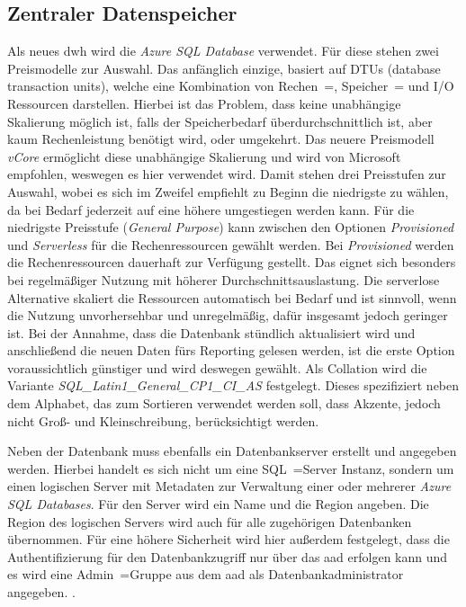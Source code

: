 \subsection{Zentraler Datenspeicher} \label{subsec:infra:konfig:datenspeicher}
Als neues \ac{dwh} wird die \textit{Azure SQL Database} verwendet. Für diese stehen zwei Preismodelle zur Auswahl. Das anfänglich einzige, basiert auf DTUs (database transaction units), welche eine Kombination von Rechen~=, Speicher~= und I/O Ressourcen darstellen. Hierbei ist das Problem, dass keine unabhängige Skalierung möglich ist, falls der Speicherbedarf überdurchschnittlich ist, aber kaum Rechenleistung benötigt wird, oder umgekehrt. Das neuere Preismodell \textit{vCore} ermöglicht diese unabhängige Skalierung und wird von Microsoft empfohlen, weswegen es hier verwendet wird. Damit stehen drei Preisstufen zur Auswahl, wobei es sich im Zweifel empfiehlt zu Beginn die niedrigste zu wählen, da bei Bedarf jederzeit auf eine höhere umgestiegen werden kann. Für die niedrigste Preisstufe (\textit{General Purpose}) kann zwischen den Optionen \textit{Provisioned} und \textit{Serverless} für die Rechenressourcen gewählt werden. Bei \textit{Provisioned} werden die Rechenressourcen dauerhaft zur Verfügung gestellt. Das eignet sich besonders bei regelmäßiger Nutzung mit höherer Durchschnittsauslastung. Die serverlose Alternative skaliert die Ressourcen automatisch bei Bedarf und ist sinnvoll, wenn die Nutzung unvorhersehbar und unregelmäßig, dafür insgesamt jedoch geringer ist. Bei der Annahme, dass die Datenbank stündlich aktualisiert wird und anschließend die neuen Daten fürs Reporting gelesen werden, ist die erste Option voraussichtlich günstiger und wird deswegen gewählt. Als Collation wird die Variante \textit{SQL{\_}Latin1{\_}General{\_}CP1{\_}CI{\_}AS} festgelegt. Dieses spezifiziert neben dem Alphabet, das zum Sortieren verwendet werden soll, dass Akzente, jedoch nicht Groß- und Kleinschreibung, berücksichtigt werden. \cite[vgl.][]{mauri_practical_2021}

Neben der Datenbank muss ebenfalls ein Datenbankserver erstellt und angegeben werden. Hierbei handelt es sich nicht um eine SQL~=Server Instanz, sondern um einen logischen Server mit Metadaten zur Verwaltung einer oder mehrerer \textit{Azure SQL Databases}. Für den Server wird ein Name und die Region angeben. Die Region des logischen Servers wird auch für alle zugehörigen Datenbanken übernommen. Für eine höhere Sicherheit wird hier außerdem festgelegt, dass die Authentifizierung für den Datenbankzugriff nur über das \ac{aad} erfolgen kann und es wird eine Admin~=Gruppe aus dem \ac{aad} als Datenbankadministrator angegeben. \cite[vgl.][]{ward_azure_2021}.

